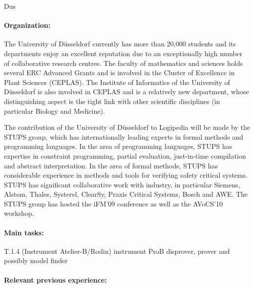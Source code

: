 \begin{sitedescription}{Dus}

\paragraph{Organization:}

The University of D\"usseldorf currently has more than 20,000 students and its departments enjoy an excellent reputation due to an exceptionally high number of collaborative research centres.
The faculty of mathematics and sciences holds several ERC Advanced Grants and is involved in the Cluster of Excellence in Plant Sciences (CEPLAS).
The Institute of Informatics of the University of D\"usseldorf is also involved in CEPLAS and is a relatively new department, whose distinguishing aspect is the tight link with other scientific disciplines (in particular Biology and Medicine).

The contribution of the University of D\"usseldorf to Logipedia will be made by the STUPS group, 
which has internationally leading experts in formal methods and programming languages.
In the area of programming languages, STUPS has expertise in constraint programming,
 partial evaluation, just-in-time compilation and abstract interpretation.
In the area of formal methods, STUPS has considerable experience in methods and
 tools for verifying safety critical systems.
STUPS has significant collaborative work with industry,
in particular Siemens, Alstom, Thales, Systerel, ClearSy, Praxis Critical Systems, Bosch  and AWE.
The STUPS group has hosted the iFM'09 conference as well as the AVoCS'10 workshop.



\paragraph{Main tasks:}

\begin{compactitem}
\item{} 
\item T.1.4 (Instrument Atelier-B/Rodin) instrument ProB disprover, prover and possibly model finder
\end{compactitem}


\paragraph{Relevant previous experience:}


\end{sitedescription}
